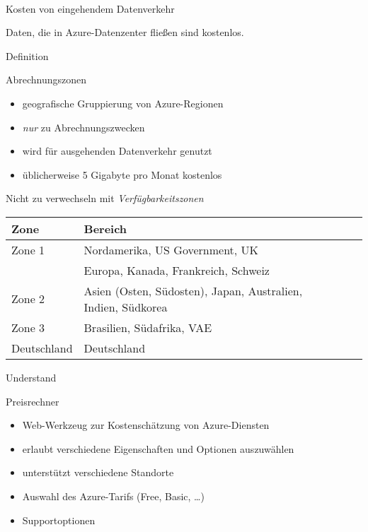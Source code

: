 \documentclass{scrartcl}
\newenvironment{flashcard}[2][]{%
    #1
    \vfill
    \centerline{\Large{#2}}
    \vfill
\newpage
}
{\newpage}
\begin{document}
    \begin{flashcard}[\ ]{Kosten von eingehendem Datenverkehr}
        Daten, die in Azure-Datenzenter fließen sind kostenlos.
    \end{flashcard}

    \begin{flashcard}[Definition]{Abrechnungszonen}
        \begin{itemize}
            \item geografische Gruppierung von Azure-Regionen
            \item \emph{nur} zu Abrechnungszwecken
            \item wird für ausgehenden Datenverkehr genutzt
            \item üblicherweise 5 Gigabyte pro Monat kostenlos
        \end{itemize}
        Nicht zu verwechseln mit \emph{Verfügbarkeitszonen}

        \begin{tabular}{l|lll}
            Zone        &  Bereich\\
            \hline
            Zone 1      &  Nordamerika, US Government, UK\\
                        & Europa, Kanada, Frankreich, Schweiz\\
            Zone 2      &  Asien (Osten, Südosten), Japan, Australien, Indien, Südkorea\\
            Zone 3      &  Brasilien, Südafrika, VAE\\
            Deutschland & Deutschland\\
        \end{tabular}

    \end{flashcard}

    \begin{flashcard}[Understand]{Preisrechner}
        \begin{itemize}
            \item Web-Werkzeug zur Kostenschätzung von Azure-Diensten
            \item erlaubt verschiedene Eigenschaften und Optionen auszuwählen
            \item unterstützt verschiedene Standorte
            \item Auswahl des Azure-Tarifs (Free, Basic, \ldots)
            \item Supportoptionen
        \end{itemize}

    \end{flashcard}
\end{document}
